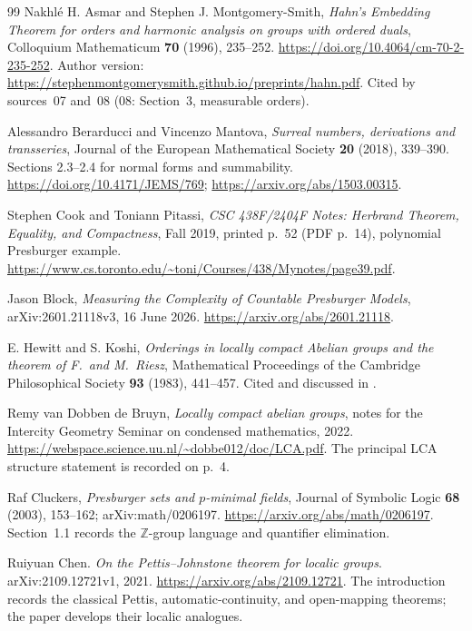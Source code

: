 \documentclass[11pt]{article}
\numberwithin{equation}{section}
\theoremstyle{definition}
\theoremstyle{remark}
\newcommand{\Z}{\mathbb Z}
\begin{document}
\begin{thebibliography}{99}
Nakhl\'e H. Asmar and Stephen J. Montgomery-Smith,
\emph{Hahn's Embedding Theorem for orders and harmonic analysis on groups
with ordered duals},
Colloquium Mathematicum \textbf{70} (1996), 235--252.
\url{https://doi.org/10.4064/cm-70-2-235-252}.
Author version: \url{https://stephenmontgomerysmith.github.io/preprints/hahn.pdf}.
Cited by sources~07 and~08 (08: Section~3, measurable orders).

Alessandro Berarducci and Vincenzo Mantova,
\emph{Surreal numbers, derivations and transseries},
Journal of the European Mathematical Society \textbf{20} (2018), 339--390.
Sections 2.3--2.4 for normal forms and summability.
\url{https://doi.org/10.4171/JEMS/769};
\url{https://arxiv.org/abs/1503.00315}.

Stephen Cook and Toniann Pitassi,
\emph{CSC 438F/2404F Notes: Herbrand Theorem, Equality, and Compactness},
Fall 2019, printed p.~52 (PDF p.~14), polynomial Presburger example.
\url{https://www.cs.toronto.edu/~toni/Courses/438/Mynotes/page39.pdf}.

Jason Block,
\emph{Measuring the Complexity of Countable Presburger Models},
arXiv:2601.21118v3, 16 June 2026.
\url{https://arxiv.org/abs/2601.21118}.

E. Hewitt and S. Koshi,
\emph{Orderings in locally compact Abelian groups and the theorem of
F.~and M.~Riesz},
Mathematical Proceedings of the Cambridge Philosophical Society
\textbf{93} (1983), 441--457.
Cited and discussed in \cite[Section~3]{AsmarMS}.

Remy van Dobben de Bruyn,
\emph{Locally compact abelian groups},
notes for the Intercity Geometry Seminar on condensed mathematics, 2022.
\url{https://webspace.science.uu.nl/~dobbe012/doc/LCA.pdf}.
The principal LCA structure statement is recorded on p.~4.

Raf Cluckers,
\emph{Presburger sets and $p$-minimal fields},
Journal of Symbolic Logic \textbf{68} (2003), 153--162;
arXiv:math/0206197.
\url{https://arxiv.org/abs/math/0206197}.
Section~1.1 records the $\Z$-group language and quantifier elimination.

Ruiyuan Chen.
\emph{On the Pettis--Johnstone theorem for localic groups}.
arXiv:2109.12721v1, 2021.
\url{https://arxiv.org/abs/2109.12721}.
The introduction records the classical Pettis, automatic-continuity, and
open-mapping theorems; the paper develops their localic analogues.


\end{thebibliography}
\end{document}
